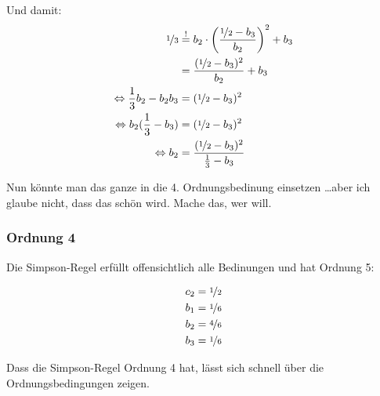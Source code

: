 Und damit:
\begin{align}
    \nicefrac{1}{3} &\stackrel{!}{=} b_2 \cdot \left (\frac{\nicefrac{1}{2} - b_3}{b_2} \right )^2 + b_3\\
                &= \frac{(\nicefrac{1}{2} - b_3)^2}{b_2} + b_3\\
\Leftrightarrow \frac{1}{3} b_2 - b_2 b_3&= (\nicefrac{1}{2} - b_3)^2\\
\Leftrightarrow b_2 (\frac{1}{3} - b_3) &= (\nicefrac{1}{2} - b_3)^2\\
\Leftrightarrow b_2  &= \frac{(\nicefrac{1}{2} - b_3)^2}{\frac{1}{3} - b_3}
\end{align}

Nun könnte man das ganze in die 4. Ordnungsbedinung einsetzen \dots aber ich
glaube nicht, dass das schön wird. Mache das, wer will. 

\subsubsection*{Ordnung 4}
Die Simpson-Regel erfüllt offensichtlich alle Bedinungen und hat
Ordnung 5:

\begin{align}
    c_2 &= \nicefrac{1}{2}\\
    b_1 &= \nicefrac{1}{6}\\
    b_2 &= \nicefrac{4}{6}\\
    b_3 &= \nicefrac{1}{6}
\end{align}

Dass die Simpson-Regel Ordnung 4 hat, lässt sich schnell über
die Ordnungsbedingungen zeigen. 
